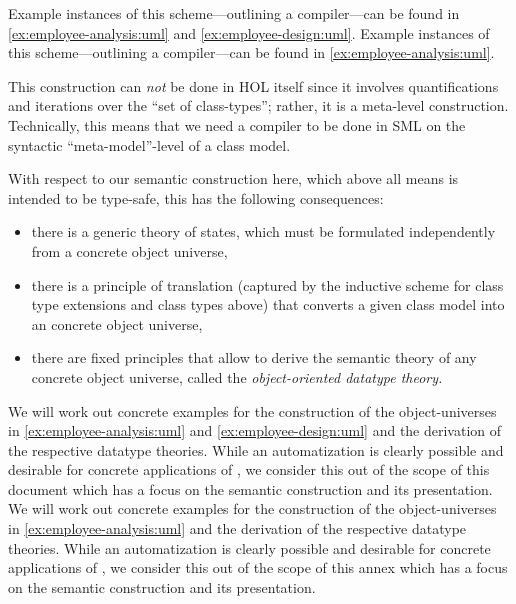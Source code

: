 \isatagafp
Example instances of this scheme---outlining a compiler---can be found
in \autoref{ex:employee-analysis:uml} and \autoref{ex:employee-design:uml}.
\endisatagafp
\isatagannexa
Example instances of this scheme---outlining a compiler---can be found
in \autoref{ex:employee-analysis:uml}.
\endisatagannexa

This construction can \emph{not} be done in HOL itself since it
involves quantifications and iterations over the ``set of class-types'';
rather, it is a meta-level construction.  Technically, this means that
we need a compiler to be done in SML on the syntactic
``meta-model''-level of a class model.

With respect to our semantic construction here,
which above all means is intended to be type-safe, this has the following consequences:
\begin{itemize}
\item there is a generic theory of states, which must be formulated independently
      from a concrete object universe,
\item there is a principle of translation (captured by the inductive scheme for
      class type extensions and class types above) that converts a given class model
      into an concrete object universe,
\item there are fixed principles that allow to derive the semantic theory of any
      concrete object universe, called the \emph{object-oriented datatype theory.}
\end{itemize}
\isatagafp
We will work out concrete examples for the construction of the
object-universes in \autoref{ex:employee-analysis:uml} and \autoref{ex:employee-design:uml} and the
derivation of the respective datatype theories. While an
automatization is clearly possible and desirable for concrete
applications of  \FOCL, we consider this out of the scope
of this document which has a focus on the semantic construction and its
presentation.
\endisatagafp
\isatagannexa
We will work out concrete examples for the construction of the
object-universes in \autoref{ex:employee-analysis:uml} and the
derivation of the respective datatype theories. While an
automatization is clearly possible and desirable for concrete
applications of  \FOCL, we consider this out of the scope
of this annex which has a focus on the semantic construction and its
presentation.
\endisatagannexa


